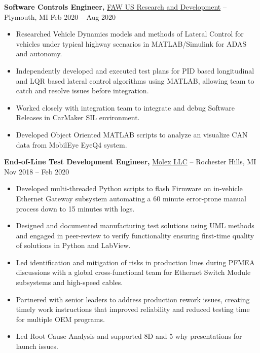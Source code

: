 \documentclass[11pt]{article}       %
\begin{document}
\textbf{Software Controls Engineer,} \href{}{FAW US Research and Development} -- Plymouth, MI \hfill Feb 2020 -- Aug 2020 \\
\vspace{-9pt}
\begin{itemize}
  \item Researched Vehicle Dynamics models and methods of Lateral Control for vehicles under typical highway scenarios in MATLAB/Simulink for ADAS and autonomy.
  \item Independently developed and executed test plans for PID based longitudinal and LQR based lateral control algorithms using MATLAB, allowing team to catch and resolve issues before integration.
  \item Worked closely with integration team to integrate and debug Software Releases in CarMaker SIL environment.
  \item Developed Object Oriented MATLAB scripts to analyze an visualize CAN data from MobilEye EyeQ4 system.
\end{itemize}


\textbf{End-of-Line Test Development Engineer,} \href{}{Molex LLC} -- Rochester Hills, MI \hfill Nov 2018 -- Feb 2020 \\
\vspace{-9pt}
\begin{itemize}
  \item Developed multi-threaded Python scripts to flash Firmware on in-vehicle Ethernet Gateway subsystem automating a 60 minute error-prone manual process down to 15 minutes with logs.
  \item Designed and documented manufacturing test solutions using UML methods and engaged in peer-review to verify functionality ensuring first-time quality of solutions in Python and LabView.
  \item Led identification and mitigation of risks in production lines during PFMEA discussions with a global cross-functional team for Ethernet Switch Module subsystems and high-speed cables.
  \item Partnered with senior leaders to address production rework issues, creating timely work instructions that improved reliability and reduced testing time for multiple OEM programs.
  \item Led Root Cause Analysis and supported 8D and 5 why presentations for launch issues.
\end{itemize}
\end{document}
